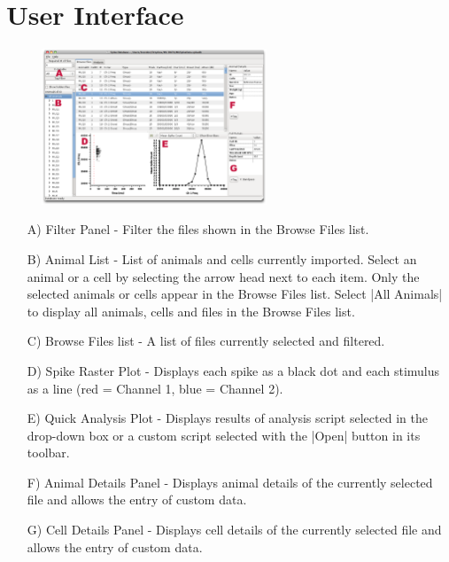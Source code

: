\documentclass{report}
\begin{document}
\clearpage
\chapter{User Interface}
\begin{figure}[h]
\begin{center}
	\includegraphics[width=0.6\textwidth]{main_window_letters.png}
\end{center}
\end{figure}
\begin{itemize}
	\item[A)] Filter Panel - Filter the files shown in the Browse Files list.
	\item[B)] Animal List - List of animals and cells currently imported.  Select an animal or a cell by selecting the arrow head next to each item. Only the selected animals or cells appear in the Browse Files list. Select |All Animals| to display all animals, cells and files in the Browse Files list.
	\item[C)] Browse Files list - A list of files currently selected and filtered.
	\item[D)] Spike Raster Plot - Displays each spike as a black dot and each stimulus as a line (red = Channel 1, blue = Channel 2).
	\item[E)] Quick Analysis Plot - Displays results of analysis script selected in the drop-down box or a custom script selected with the |Open| button in its toolbar.
	\item[F)] Animal Details Panel - Displays animal details of the currently selected file and allows the entry of custom data.
	\item[G)] Cell Details Panel - Displays cell details of the currently selected file and allows the entry of custom data.
\end{itemize}

		
\clearpage
\end{document}
